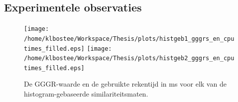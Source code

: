 \subsection{Experimentele observaties}


\begin{figure}[tbp]
\begin{center}
\texttt{[image: /home/klbostee/Workspace/Thesis/plots/histgeb1\_gggrs\_en\_cputimes\_filled.eps]}
\texttt{[image: /home/klbostee/Workspace/Thesis/plots/histgeb2\_gggrs\_en\_cputimes\_filled.eps]}
\caption{\label{fig:histgeb_gggrs_en_cputimes}De GGGR-waarde en de gebruikte rekentijd in ms voor elk van de histogram-gebaseerde similariteitsmaten.}
\end{center}
\end{figure}

